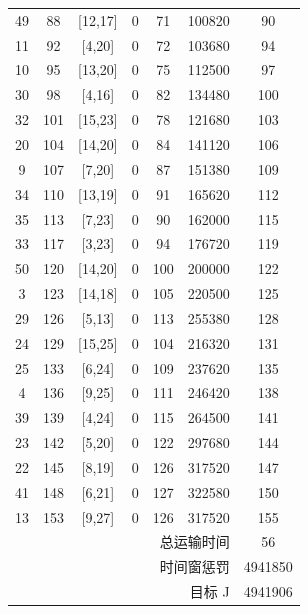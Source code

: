 \begin{table}[htbp]
\begin{tabular}{ccccccc}
49 & 88 & [12,17] & 0 & 71 & 100820 & 90 \\
11 & 92 & [4,20] & 0 & 72 & 103680 & 94 \\
10 & 95 & [13,20] & 0 & 75 & 112500 & 97 \\
30 & 98 & [4,16] & 0 & 82 & 134480 & 100 \\
32 & 101 & [15,23] & 0 & 78 & 121680 & 103 \\
20 & 104 & [14,20] & 0 & 84 & 141120 & 106 \\
9 & 107 & [7,20] & 0 & 87 & 151380 & 109 \\
34 & 110 & [13,19] & 0 & 91 & 165620 & 112 \\
35 & 113 & [7,23] & 0 & 90 & 162000 & 115 \\
33 & 117 & [3,23] & 0 & 94 & 176720 & 119 \\
50 & 120 & [14,20] & 0 & 100 & 200000 & 122 \\
3 & 123 & [14,18] & 0 & 105 & 220500 & 125 \\
29 & 126 & [5,13] & 0 & 113 & 255380 & 128 \\
24 & 129 & [15,25] & 0 & 104 & 216320 & 131 \\
25 & 133 & [6,24] & 0 & 109 & 237620 & 135 \\
4 & 136 & [9,25] & 0 & 111 & 246420 & 138 \\
39 & 139 & [4,24] & 0 & 115 & 264500 & 141 \\
23 & 142 & [5,20] & 0 & 122 & 297680 & 144 \\
22 & 145 & [8,19] & 0 & 126 & 317520 & 147 \\
41 & 148 & [6,21] & 0 & 127 & 322580 & 150 \\
13 & 153 & [9,27] & 0 & 126 & 317520 & 155 \\
\midrule
\multicolumn{6}{r}{总运输时间} & 56 \\
\multicolumn{6}{r}{时间窗惩罚} & 4941850 \\
\multicolumn{6}{r}{目标 J} & 4941906 \\
\bottomrule
\end{tabular}
\end{table}
